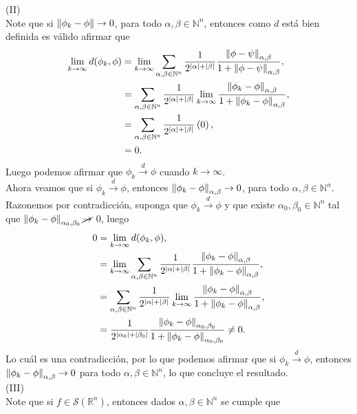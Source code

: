 \begin{homeworkProblem}
\begin{solution}
    (II)\\
    Note que si $\left\|\phi_{k}-\phi\right\|\to 0$, para todo $\alpha,\beta\in\mathbb{N}^{n}$, entonces como $d$ está bien definida es válido afirmar que
    \begin{align*}
      \lim_{k \to \infty}d(\phi_{k},\phi)&=\lim_{k \to \infty}\sum_{\alpha,\beta\in\mathbb{N}^{n}}\frac{1}{2^{|\alpha|+|\beta|}}\frac{\left\|\phi-\psi\right\|_{\alpha,\beta}}{1+\left\|\phi-\psi\right\|_{\alpha,\beta}},\\
      &=\sum_{\alpha,\beta\in\mathbb{N}^{n}}\frac{1}{2^{|\alpha|+|\beta|}}\lim_{k \to \infty}\frac{\left\|\phi_{k}-\phi\right\|_{\alpha,\beta}}{1+\left\|\phi_{k}-\phi\right\|_{\alpha,\beta}},\\
      &=\sum_{\alpha,\beta\in\mathbb{N}^{n}}\frac{1}{2^{|\alpha|+|\beta|}}\left( 0 \right),\\
      &=0.
    \end{align*}
    Luego podemos afirmar que $\phi_{k}\overset{d}{\to}\phi$ cuando $k\to\infty$.\\
    Ahora veamos que si $\phi_{k}\overset{d}{\to}\phi$, entonces $\left\|\phi_{k}-\phi\right\|_{\alpha,\beta}\to 0$, para todo $\alpha,\beta\in\mathbb{N}^{n}$.\\
    Razonemos por contradicción, suponga que $\phi_k\overset{d}{\to}\phi$ y que existe $\alpha_{0},\beta_{0}\in\mathbb{N}^{n}$ tal que $\left\|\phi_{k}-\phi\right\|_{\alpha_{0},\beta_{0}}\cancel{\to}$ $0$, luego
    \begin{align*}
      0 &= \lim_{k \to \infty}d(\phi_{k},\phi),\\
      &=\lim_{k \to \infty}\sum_{\alpha,\beta\in\mathbb{N}^{n}}\frac{1}{2^{|\alpha|+|\beta|}}\frac{\left\|\phi_{k}-\phi\right\|_{\alpha,\beta}}{1+\left\|\phi_{k}-\phi\right\|_{\alpha,\beta}},\\
      &=\sum_{\alpha,\beta\in\mathbb{N}^{n}}\frac{1}{2^{|\alpha|+|\beta|}}\lim_{k \to \infty}\frac{\left\|\phi_{k}-\phi\right\|_{\alpha,\beta}}{1+\left\|\phi_k-\phi\right\|_{\alpha,\beta}},\\
      &=\frac{1}{2^{|\alpha_{0}|+|\beta_{0}|}}\frac{\left\|\phi_{k}-\phi\right\|_{\alpha_0,\beta_0}}{1+\left\|\phi_k-\phi\right\|_{\alpha_0,\beta_0}}\neq 0.
    \end{align*}
    Lo cuál es una contradicción, por lo que podemos afirmar que si $\phi_{k}\overset{d}{\to}\phi$, entonces $\left\|\phi_k-\phi\right\|_{\alpha,\beta}\to 0$ para todo $\alpha,\beta\in\mathbb{N}^{n}$, lo que concluye el resultado.\\
    (III)\\
    Note que si $f\in \mathcal{S}(\mathbb{R}^{n})$, entonces dados $\alpha,\beta\in\mathbb{N}^{n}$ se cumple que 

\end{solution}
\end{homeworkProblem}
